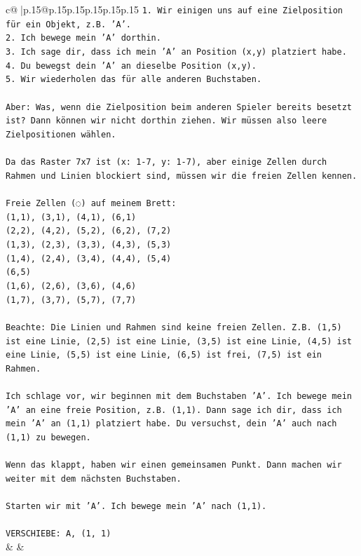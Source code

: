 \documentclass{article}
\begin{document}
{\begin{supertabular}{c@{$\;$}|p{.15\linewidth}@{}p{.15\linewidth}p{.15\linewidth}p{.15\linewidth}p{.15\linewidth}p{.15\linewidth}}
{{{\texttt{1. Wir einigen uns auf eine Zielposition für ein Objekt, z.B. 'A'.} \\
\texttt{2. Ich bewege mein 'A' dorthin.} \\
\texttt{3. Ich sage dir, dass ich mein 'A' an Position (x,y) platziert habe.} \\
\texttt{4. Du bewegst dein 'A' an dieselbe Position (x,y).} \\
\texttt{5. Wir wiederholen das für alle anderen Buchstaben.} \\
\\ 
\texttt{Aber: Was, wenn die Zielposition beim anderen Spieler bereits besetzt ist? Dann können wir nicht dorthin ziehen. Wir müssen also leere Zielpositionen wählen.} \\
\\ 
\texttt{Da das Raster 7x7 ist (x: 1{-}7, y: 1{-}7), aber einige Zellen durch Rahmen und Linien blockiert sind, müssen wir die freien Zellen kennen.} \\
\\ 
\texttt{Freie Zellen (◌) auf meinem Brett:} \\
\texttt{(1,1), (3,1), (4,1), (6,1)} \\
\texttt{(2,2), (4,2), (5,2), (6,2), (7,2)} \\
\texttt{(1,3), (2,3), (3,3), (4,3), (5,3)} \\
\texttt{(1,4), (2,4), (3,4), (4,4), (5,4)} \\
\texttt{(6,5)} \\
\texttt{(1,6), (2,6), (3,6), (4,6)} \\
\texttt{(1,7), (3,7), (5,7), (7,7)} \\
\\ 
\texttt{Beachte: Die Linien und Rahmen sind keine freien Zellen. Z.B. (1,5) ist eine Linie, (2,5) ist eine Linie, (3,5) ist eine Linie, (4,5) ist eine Linie, (5,5) ist eine Linie, (6,5) ist frei, (7,5) ist ein Rahmen.} \\
\\ 
\texttt{Ich schlage vor, wir beginnen mit dem Buchstaben 'A'. Ich bewege mein 'A' an eine freie Position, z.B. (1,1). Dann sage ich dir, dass ich mein 'A' an (1,1) platziert habe. Du versuchst, dein 'A' auch nach (1,1) zu bewegen.} \\
\\ 
\texttt{Wenn das klappt, haben wir einen gemeinsamen Punkt. Dann machen wir weiter mit dem nächsten Buchstaben.} \\
\\ 
\texttt{Starten wir mit 'A'. Ich bewege mein 'A' nach (1,1).} \\
\\ 
\texttt{VERSCHIEBE: A, (1, 1)} \\
            }
        }
    }
    & & \\ \\


\end{supertabular}}
\end{document}
